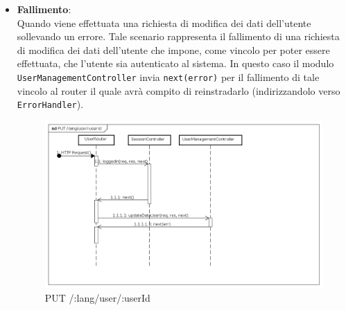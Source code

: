 \begin{itemize}
\item \textbf{Fallimento}:
\\
Quando viene effettuata una richiesta di modifica dei dati dell'utente sollevando un errore. Tale scenario rappresenta il fallimento di una richiesta di modifica dei dati dell'utente che impone, come vincolo per poter essere effettuata, che l'utente sia autenticato al sistema. In questo caso il modulo \texttt{UserManagementController} invia \texttt{next(error)} per il fallimento di tale vincolo al router il quale avrà compito di reinstradarlo (indirizzandolo verso \texttt{ErrorHandler}).
\label{Fallimento della procedura di modifica dati utente}
\begin{figure}[ht]
	\centering
	\includegraphics[scale=0.40]{UML/DiagrammiDiSequenza/Back-end/PUT_LangUserUseridFailure.png}
	
	\caption{PUT /:lang/user/:userId}
\end{figure}
\FloatBarrier
\end{itemize}

